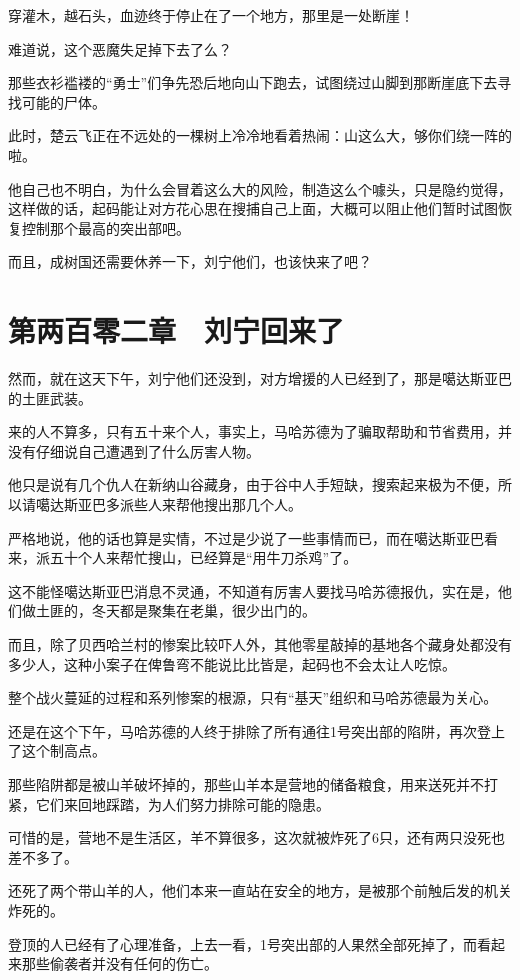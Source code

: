 穿灌木，越石头，血迹终于停止在了一个地方，那里是一处断崖！

难道说，这个恶魔失足掉下去了么？

那些衣衫褴褛的“勇士”们争先恐后地向山下跑去，试图绕过山脚到那断崖底下去寻找可能的尸体。

此时，楚云飞正在不远处的一棵树上冷冷地看着热闹：山这么大，够你们绕一阵的啦。

他自己也不明白，为什么会冒着这么大的风险，制造这么个噱头，只是隐约觉得，这样做的话，起码能让对方花心思在搜捕自己上面，大概可以阻止他们暂时试图恢复控制那个最高的突出部吧。

而且，成树国还需要休养一下，刘宁他们，也该快来了吧？

\section{第两百零二章　刘宁回来了}

然而，就在这天下午，刘宁他们还没到，对方增援的人已经到了，那是噶达斯亚巴的土匪武装。

来的人不算多，只有五十来个人，事实上，马哈苏德为了骗取帮助和节省费用，并没有仔细说自己遭遇到了什么厉害人物。

他只是说有几个仇人在新纳山谷藏身，由于谷中人手短缺，搜索起来极为不便，所以请噶达斯亚巴多派些人来帮他搜出那几个人。

严格地说，他的话也算是实情，不过是少说了一些事情而已，而在噶达斯亚巴看来，派五十个人来帮忙搜山，已经算是“用牛刀杀鸡”了。

这不能怪噶达斯亚巴消息不灵通，不知道有厉害人要找马哈苏德报仇，实在是，他们做土匪的，冬天都是聚集在老巢，很少出门的。

而且，除了贝西哈兰村的惨案比较吓人外，其他零星敲掉的基地各个藏身处都没有多少人，这种小案子在俾鲁弯不能说比比皆是，起码也不会太让人吃惊。

整个战火蔓延的过程和系列惨案的根源，只有“基天”组织和马哈苏德最为关心。

还是在这个下午，马哈苏德的人终于排除了所有通往1号突出部的陷阱，再次登上了这个制高点。

那些陷阱都是被山羊破坏掉的，那些山羊本是营地的储备粮食，用来送死并不打紧，它们来回地踩踏，为人们努力排除可能的隐患。

可惜的是，营地不是生活区，羊不算很多，这次就被炸死了6只，还有两只没死也差不多了。

还死了两个带山羊的人，他们本来一直站在安全的地方，是被那个前触后发的机关炸死的。

登顶的人已经有了心理准备，上去一看，1号突出部的人果然全部死掉了，而看起来那些偷袭者并没有任何的伤亡。

